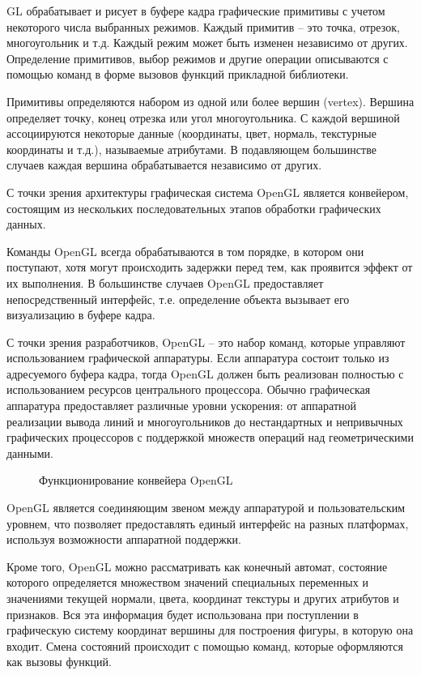 GL обрабатывает и рисует в буфере кадра графические примитивы с учетом некоторого числа выбранных режимов. Каждый примитив – это точка, отрезок, многоугольник и т.д. Каждый режим может быть изменен независимо от других. Определение примитивов, выбор режимов и другие операции описываются с помощью команд в форме вызовов функций прикладной библиотеки.

Примитивы определяются набором из одной или более вершин (vertex). Вершина определяет точку, конец отрезка или угол многоугольника. С каждой вершиной ассоциируются некоторые данные (координаты, цвет, нормаль, текстурные координаты и т.д.), называемые атрибутами. В подавляющем большинстве случаев каждая вершина обрабатывается независимо от других.

С точки зрения архитектуры графическая система OpenGL является конвейером, состоящим из нескольких последовательных этапов обработки графических данных.

Команды OpenGL всегда обрабатываются в том порядке, в котором они поступают, хотя могут происходить задержки перед тем, как проявится эффект от их выполнения. В большинстве случаев OpenGL предоставляет непосредственный интерфейс, т.е. определение объекта вызывает его визуализацию в буфере кадра.

С точки зрения разработчиков, OpenGL – это набор команд, которые управляют использованием графической аппаратуры. Если аппаратура состоит только из адресуемого буфера кадра, тогда OpenGL должен быть реализован полностью с использованием ресурсов центрального процессора. Обычно графическая аппаратура предоставляет различные уровни ускорения: от аппаратной реализации вывода линий и многоугольников до нестандартных и непривычных графических процессоров с поддержкой множеств операций над геометрическими данными.

\begin{figure}[H]
	\caption{Функционирование конвейера OpenGL}
	\label{diagram7:image}
\end{figure}

OpenGL является соединяющим звеном между аппаратурой и пользовательским уровнем, что позволяет предоставлять единый интерфейс на разных платформах, используя возможности аппаратной поддержки.

Кроме того, OpenGL можно рассматривать как конечный автомат, состояние которого определяется множеством значений специальных переменных и значениями текущей нормали, цвета, координат текстуры и других атрибутов и признаков. Вся эта информация будет использована при поступлении в графическую систему координат вершины для построения фигуры, в которую она входит. Смена состояний происходит с помощью команд, которые оформляются как вызовы функций.

